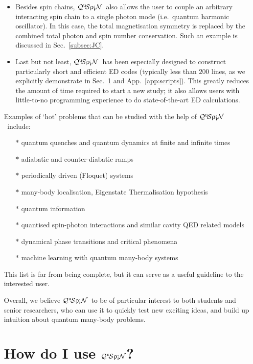 \documentclass{SciPost}
\newcommand\0{\scalebox{-1}[1]{0}}
\newcommand{\qspin}{$\mathcal{Q}^{\mathrm{u}}\!\mathcal{S}\uprho\mathrm{\text{\textexclamdown}}\mathcal{N}$}
\begin{document}
\begin{itemize}
	\item Besides spin chains, \qspin\ also allows the user to couple an arbitrary interacting spin chain to a single photon mode (i.e.~quantum harmonic oscillator). In this case, the total magnetisation symmetry is replaced by the combined total photon and spin number conservation. Such an example is discussed in Sec.~\ref{subsec:JC}.
	\item Last but not least, \qspin\ has been especially designed to construct particularly short and efficient ED codes (typically less than $200$ lines, as we explicitly demonstrate in Sec.~\ref{sec:examples} and App.~\ref{app:scripts}). This greatly reduces the amount of time required to start a new study; it also allows users with little-to-no programming experience to do state-of-the-art ED calculations.
\end{itemize}

\noindent Examples of `hot' problems that can be studied with the help of \qspin\ include:
\begin{itemize}
	\item[$\ast$] quantum quenches and quantum dynamics at finite and infinite times
	\item[$\ast$] adiabatic and counter-diabatic ramps 
	\item[$\ast$] periodically driven (Floquet) systems
	\item[$\ast$] many-body localisation, Eigenstate Thermalisation hypothesis
	\item[$\ast$] quantum information
	\item[$\ast$] quantised spin-photon interactions and similar cavity QED related models
	\item[$\ast$] dynamical phase transitions and critical phenomena
	\item[$\ast$] machine learning with quantum many-body systems
\end{itemize}
This list is far from being complete, but it can serve as a useful guideline to the interested user. 

Overall, we believe \qspin\ to be of particular interest to both students and senior researchers, who can use it to quickly test new exciting ideas, and build up intuition about quantum many-body problems.


\section{How do I use \qspin?}
\label{sec:examples}
\end{document}

